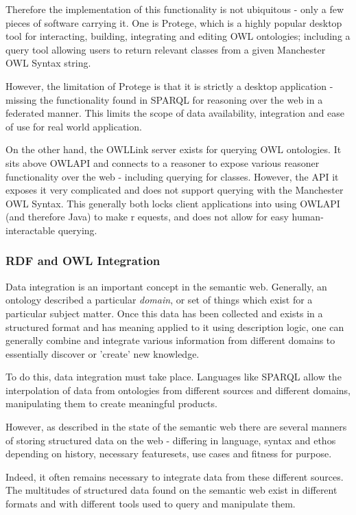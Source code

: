\documentclass{article}
\begin{document}
Therefore the implementation of this functionality is not ubiquitous - only a
few pieces of software carrying it. One is Protege, which is a highly popular
desktop tool for interacting, building, integrating and editing OWL ontologies;
including a query tool allowing users to return relevant classes from a given
Manchester OWL Syntax string. 

However, the limitation of Protege is that it is strictly a desktop application
- missing the functionality found in SPARQL for reasoning over the web in a
federated manner. This limits the scope of data availability, integration and
ease of use for real world application. 

On the other hand, the OWLLink server exists for querying OWL ontologies. It
sits above OWLAPI and connects to a reasoner to expose various reasoner
functionality over the web - including querying for classes. However, the API it
exposes it very complicated and does not support querying with the Manchester
OWL Syntax. This generally
both locks client applications into using OWLAPI (and therefore Java) to make r
equests, and does not allow for easy human-interactable querying. 

\subsubsection{RDF and OWL Integration}

Data integration is an important concept in the semantic web. Generally, an
ontology described a particular \emph{domain}, or set of things which exist for
a particular subject matter. Once this data has been collected and exists in a
structured format and has meaning applied to it using description logic, one can
generally combine and integrate various information from different domains to
essentially discover or 'create' new knowledge.

To do this, data integration must take place. Languages like SPARQL allow the
interpolation of data from ontologies from different sources and different
domains, manipulating them to create meaningful products. 

However, as described in the state of the semantic web there are several manners
of storing structured data on the web - differing in language, syntax and ethos
depending on history, necessary featuresets, use cases and fitness for purpose.

Indeed, it often remains necessary to integrate data from these different
sources. The multitudes of structured data found on the semantic web exist in different
formats and with different tools used to query and manipulate them.
\end{document}
